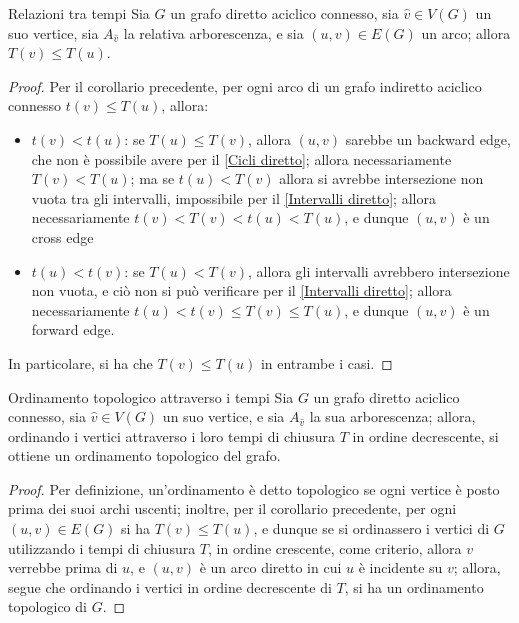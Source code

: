 \documentclass[a4paper, 12pt]{report}
\begin{document}
    \begin{framedcor}{Relazioni tra tempi}
        Sia $G$ un grafo diretto aciclico connesso, sia $\hat v \in V(G)$ un suo vertice, sia $A_{\hat v}$ la relativa arborescenza, e sia $(u, v) \in E(G)$ un arco; allora $T(v) \le T(u)$.
    \end{framedcor}

    \begin{proof}
        Per il corollario precedente, per ogni arco di un grafo indiretto aciclico connesso $t(v) \le T(u)$, allora:
        \begin{itemize}
            \item $t(v) < t(u)$: se $T(u) \le T(v)$, allora $(u, v)$ sarebbe un backward edge, che non è possibile avere per il \cref{Cicli diretto}; allora necessariamente $T(v) < T(u)$; ma se $t(u) < T(v)$ allora si avrebbe intersezione non vuota tra gli intervalli, impossibile per il \cref{Intervalli diretto}; allora necessariamente $t(v) < T(v) < t(u) < T(u)$, e dunque $(u, v)$ è un cross edge
            \item $t(u) < t(v)$: se $T(u) < T(v)$, allora gli intervalli avrebbero intersezione non vuota, e ciò non si può verificare per il \cref{Intervalli diretto}; allora necessariamente $t(u) < t(v) \le T(v) \le T(u)$, e dunque $(u, v)$ è un forward edge.
        \end{itemize}

        In particolare, si ha che $T(v) \le T(u)$ in entrambe i casi.
    \end{proof}

    \begin{framedthm}{Ordinamento topologico attraverso i tempi}
        Sia $G$ un grafo diretto aciclico connesso, sia $\hat v \in V(G)$ un suo vertice, e sia $A_{\hat v}$ la sua arborescenza; allora, ordinando i vertici attraverso i loro tempi di chiusura $T$ in ordine decrescente, si ottiene un ordinamento topologico del grafo.
    \end{framedthm}

    \begin{proof}
        Per definizione, un'ordinamento è detto topologico se ogni vertice è posto prima dei suoi archi uscenti; inoltre, per il corollario precedente, per ogni $(u, v) \in E(G)$ si ha $T(v) \le T(u)$, e dunque se si ordinassero i vertici di $G$ utilizzando i tempi di chiusura $T$, in ordine crescente, come criterio, allora $v$ verrebbe prima di $u$, e $(u, v)$ è un arco diretto in cui $u$ è incidente su $v$; allora, segue che ordinando i vertici in ordine decrescente di $T$, si ha un ordinamento topologico di $G$.
    \end{proof}
\end{document}
